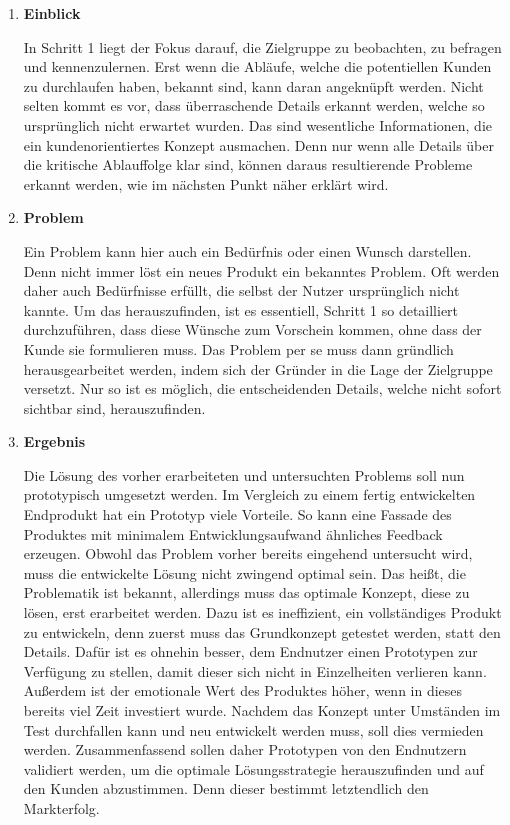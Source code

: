 \begin{enumerate}
	\item \textbf{Einblick}
	
	In Schritt 1 liegt der Fokus darauf, die Zielgruppe zu beobachten, zu befragen und kennenzulernen. Erst wenn die Abläufe, welche die potentiellen Kunden zu durchlaufen haben, bekannt sind, kann daran angeknüpft werden. Nicht selten kommt es vor, dass überraschende Details erkannt werden, welche so ursprünglich nicht erwartet wurden. Das sind wesentliche Informationen, die ein kundenorientiertes Konzept ausmachen. Denn nur wenn alle Details über die kritische Ablauffolge klar sind, können daraus resultierende Probleme erkannt werden, wie im nächsten Punkt näher erklärt wird. 
	
	\item \textbf{Problem}
	
	Ein Problem kann hier auch ein Bedürfnis oder einen Wunsch darstellen. Denn nicht immer löst ein neues Produkt ein bekanntes Problem. Oft werden daher auch Bedürfnisse erfüllt, die selbst der Nutzer ursprünglich nicht kannte. Um das herauszufinden, ist es essentiell, Schritt 1 so detailliert durchzuführen, dass diese Wünsche zum Vorschein kommen, ohne dass der Kunde sie formulieren muss. Das Problem per se muss dann gründlich herausgearbeitet werden, indem sich der Gründer in die Lage der Zielgruppe versetzt. Nur so ist es möglich, die entscheidenden Details, welche nicht sofort sichtbar sind, herauszufinden.
	
	\item \textbf{Ergebnis}
	
	Die Lösung des vorher erarbeiteten und untersuchten Problems soll nun prototypisch umgesetzt werden. Im Vergleich zu einem fertig entwickelten Endprodukt hat ein Prototyp viele Vorteile. So kann eine Fassade des Produktes mit minimalem Entwicklungsaufwand ähnliches Feedback erzeugen. Obwohl das Problem vorher bereits eingehend untersucht wird, muss die entwickelte Lösung nicht zwingend optimal sein. Das heißt, die Problematik ist bekannt, allerdings muss das optimale Konzept, diese zu lösen, erst erarbeitet werden. Dazu ist es ineffizient, ein vollständiges Produkt zu entwickeln, denn zuerst muss das Grundkonzept getestet werden, statt den Details. Dafür ist es ohnehin besser, dem Endnutzer einen Prototypen zur Verfügung zu stellen, damit dieser sich nicht in Einzelheiten verlieren kann. Außerdem ist der emotionale Wert des Produktes höher, wenn in dieses bereits viel Zeit investiert wurde. Nachdem das Konzept unter Umständen im Test durchfallen kann und neu entwickelt werden muss, soll dies vermieden werden. Zusammenfassend sollen daher Prototypen von den Endnutzern validiert werden, um die optimale Lösungsstrategie herauszufinden und auf den Kunden abzustimmen. Denn dieser bestimmt letztendlich den Markterfolg.
	

\end{enumerate}
